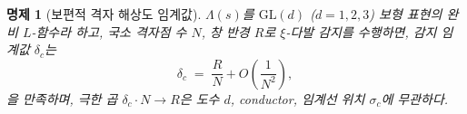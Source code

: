\documentclass[11pt, a4paper]{article}
\theoremstyle{definition}
\theoremstyle{plain}
\newtheorem{proposition}[theorem]{명제}
\newcommand{\xif}{\xi}
\begin{document}
\begin{proposition}[보편적 격자 해상도 임계값]
\label{prop:transition_universality}
$\Lambda(s)$를 $\mathrm{GL}(d)$ ($d = 1,2,3$) 보형 표현의
완비 $L$-함수라 하고, 국소 격자점 수 $N$, 창 반경 $R$로
$\xif$-다발 감지를 수행하면, 감지 임계값 $\delta_c$는
\begin{equation}
  \delta_c \;=\; \frac{R}{N} + O\!\left(\frac{1}{N^2}\right),
  \label{eq:delta_c_universal_ko}
\end{equation}
을 만족하며, 극한 곱 $\delta_c \cdot N \to R$은 도수 $d$,
conductor, 임계선 위치 $\sigma_c$에 무관하다.
\end{proposition}
\end{document}

